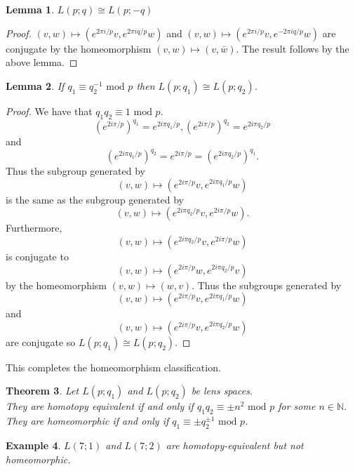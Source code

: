 \documentclass{article}
\newtheorem{theorem}{Theorem}[section]
\newtheorem{lemma}[theorem]{Lemma}
\newtheorem{example}[theorem]{Example}
\begin{document}
\begin{lemma}
$L(p;q)\cong L(p;-q)$
\end{lemma}
\begin{proof}
$(v,w)\mapsto(e^{2\pi i/p}v,e^{2\pi iq/p}w)$ and $(v,w)\mapsto(e^{2\pi i/p}v,e^{-2\pi iq/p}w)$ are conjugate by the homeomorphism $(v,w)\mapsto(v,\bar w)$. The result follows by the above lemma.
\end{proof}
\begin{lemma}
If $q_1\equiv q_2^{-1}\text{ mod }p$ then $L(p;q_1)\cong L(p;q_2)$.
\end{lemma}
\begin{proof}
We have that $q_1q_2\equiv 1\text{ mod }p$.
\[{(e^{2i\pi/p})}^{q_1}=e^{2i\pi q_1/p},{(e^{2i\pi/p})}^{q_2}=e^{2i\pi q_2/p}\] and \[{(e^{2i\pi q_1/p})}^{q_2}=e^{2i\pi /p}={(e^{2i\pi q_2/p})}^{q_1}.\] Thus the subgroup generated by \[(v,w)\mapsto(e^{2i\pi /p}v,e^{2i\pi q_1/p}w)\] is the same as the subgroup generated by \[(v,w)\mapsto(e^{2i\pi q_2/p}v,e^{2i\pi/p}w).\] Furthermore, \[(v,w)\mapsto(e^{2i\pi q_2/p}v,e^{2i\pi/p}w)\] is conjugate to \[(v,w)\mapsto(e^{2i\pi/p}w,e^{2i\pi q_2/p}v)\] by the homeomorphism $(v,w)\mapsto(w,v)$. Thus the subgroups generated by \[(v,w)\mapsto(e^{2i\pi /p}v,e^{2i\pi q_1/p}w)\] and \[(v,w)\mapsto(e^{2i\pi /p}v,e^{2i\pi q_2/p}w)\] are conjugate so $L(p;q_1)\cong L(p;q_2)$.
\end{proof}

\noindent This completes the homeomorphism classification.

\begin{theorem}
Let $L(p;q_1)$ and $L(p;q_2)$ be lens spaces.\\
They are homotopy equivalent if and only if $q_1q_2\equiv\pm n^2 \text{ mod } p$ for some $n\in\mathbb{N}$.\\
They are homeomorphic if and only if $q_1\equiv\pm q_2^{\pm 1} \text{ mod }p$.
\end{theorem}

\begin{example}
$L(7;1)$ and $L(7;2)$ are homotopy-equivalent but not homeomorphic.
\end{example}
\end{document}
